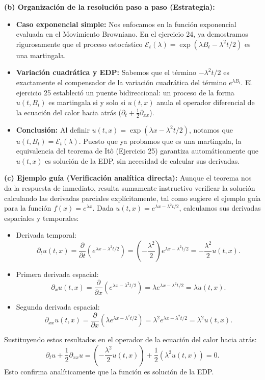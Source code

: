 \documentclass[11pt, letterpaper]{article}
\begin{document}
\begin{solucion}
    \textbf{(b) Organización de la resolución paso a paso (Estrategia):}
    \begin{itemize}
        \item[(i)] \textbf{Caso exponencial simple:} Nos enfocamos en la función exponencial evaluada en el Movimiento Browniano. En el ejercicio 24, ya demostramos rigurosamente que el proceso estocástico $\mathcal{E}_t(\lambda) = \exp(\lambda B_t - \lambda^2 t / 2)$ es una martingala.
        \item[(ii)] \textbf{Variación cuadrática y EDP:} Sabemos que el término $-\lambda^2 t / 2$ es exactamente el compensador de la variación cuadrática del término $e^{\lambda B_t}$. El ejercicio 25 estableció un puente bidireccional: un proceso de la forma $u(t, B_t)$ es martingala si y solo si $u(t, x)$ anula el operador diferencial de la ecuación del calor hacia atrás ($\partial_t + \frac{1}{2}\partial_{xx}$).
        \item[(iii)] \textbf{Conclusión:} Al definir $u(t,x) = \exp(\lambda x - \lambda^2 t / 2)$, notamos que $u(t, B_t) = \mathcal{E}_t(\lambda)$. Puesto que ya probamos que es una martingala, la equivalencia del teorema de Itô (Ejercicio 25) garantiza automáticamente que $u(t, x)$ es solución de la EDP, sin necesidad de calcular sus derivadas.
    \end{itemize}

    \vspace{3mm}
    \textbf{(c) Ejemplo guía (Verificación analítica directa):}
    Aunque el teorema nos da la respuesta de inmediato, resulta sumamente instructivo verificar la solución calculando las derivadas parciales explícitamente, tal como sugiere el ejemplo guía para la función $f(x) = e^{\lambda x}$.
    Dada $u(t,x) = e^{\lambda x - \lambda^2 t / 2}$, calculamos sus derivadas espaciales y temporales:
    \begin{itemize}
        \item Derivada temporal: 
        \[ \partial_t u(t,x) = \frac{\partial}{\partial t} \left( e^{\lambda x - \lambda^2 t / 2} \right) = \left( -\frac{\lambda^2}{2} \right) e^{\lambda x - \lambda^2 t / 2} = -\frac{\lambda^2}{2} u(t,x). \]
        \item Primera derivada espacial:
        \[ \partial_x u(t,x) = \frac{\partial}{\partial x} \left( e^{\lambda x - \lambda^2 t / 2} \right) = \lambda e^{\lambda x - \lambda^2 t / 2} = \lambda u(t,x). \]
        \item Segunda derivada espacial:
        \[ \partial_{xx} u(t,x) = \frac{\partial}{\partial x} \left( \lambda e^{\lambda x - \lambda^2 t / 2} \right) = \lambda^2 e^{\lambda x - \lambda^2 t / 2} = \lambda^2 u(t,x). \]
    \end{itemize}
    Sustituyendo estos resultados en el operador de la ecuación del calor hacia atrás:
    \[ \partial_t u + \frac{1}{2} \partial_{xx} u = \left( -\frac{\lambda^2}{2} u(t,x) \right) + \frac{1}{2} \left( \lambda^2 u(t,x) \right) = 0. \]
    Esto confirma analíticamente que la función es solución de la EDP.


\end{solucion}
\end{document}
